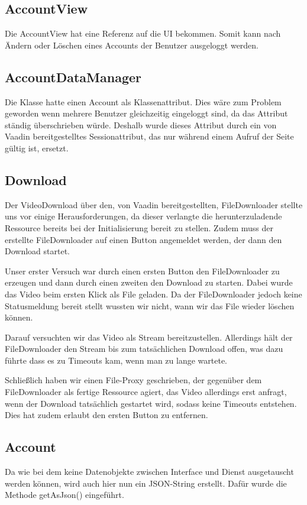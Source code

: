 \subsection{AccountView}
Die AccountView hat eine Referenz auf die UI bekommen. Somit kann nach Ändern oder Löschen eines Accounts der Benutzer ausgeloggt werden.

\subsection{AccountDataManager}
Die Klasse hatte einen Account als Klassenattribut. Dies wäre zum Problem geworden wenn mehrere Benutzer gleichzeitig eingeloggt sind, da das Attribut ständig überschrieben würde. Deshalb wurde dieses Attribut durch ein von Vaadin bereitgestelltes Sessionattribut, das nur während einem Aufruf der Seite gültig ist, ersetzt.

\subsection{Download} \label{sec:Download}
Der VideoDownload über den, von Vaadin bereitgestellten, FileDownloader stellte uns vor einige Herausforderungen, da dieser verlangte die herunterzuladende Ressource bereits bei der Initialisierung bereit zu stellen. Zudem muss der erstellte FileDownloader auf einen Button angemeldet werden, der dann den Download startet. \par
Unser erster Versuch war durch einen ersten Button den FileDownloader zu erzeugen und dann durch einen zweiten den Download zu starten. Dabei wurde das Video beim ersten Klick als File geladen. Da der FileDownloader jedoch keine Statusmeldung bereit stellt wussten wir nicht, wann wir das File wieder löschen können. \par
Darauf versuchten wir das Video als Stream bereitzustellen. Allerdings hält der FileDownloader den Stream bis zum tatsächlichen Download offen, was dazu führte dass es zu Timeouts kam, wenn man zu lange wartete. \par
Schließlich haben wir einen File-Proxy geschrieben, der gegenüber dem FileDownloader als fertige Ressource agiert, das Video allerdings erst anfragt, wenn der Download tatsächlich gestartet wird, sodass keine Timeouts entstehen. Dies hat zudem erlaubt den ersten Button zu entfernen.

\subsection{Account}
Da wie bei dem  keine Datenobjekte zwischen Interface und Dienst ausgetauscht werden können, wird auch hier nun ein JSON-String erstellt. Dafür wurde die Methode getAsJson() eingeführt.

